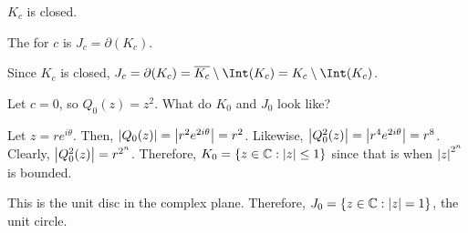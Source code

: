 \documentclass[class=pmath370,tikz,notes]{agony}
\begin{document}
\begin{lemma}[Assignment 4]
  $K_c$ is closed.
\end{lemma}

\begin{defn}
  The  for $c$ is $J_c = \partial(K_c)$.
\end{defn}

\begin{remark}
  Since $K_c$ is closed, $J_c = \partial(K_c) = \overline{K_c} \setminus \Int(K_c) = K_c \setminus \Int(K_c)$.
\end{remark}

\begin{example}
  Let $c = 0$, so $Q_0(z) = z^2$. What do $K_0$ and $J_0$ look like?
\end{example}
\begin{sol}
  Let $z = re^{i\theta}$.
  Then, $\abs{Q_0(z)} = \abs{r^2e^{2i\theta}} = r^2$.
  Likewise, $\abs{Q_0^2(z)} = \abs{r^4e^{2i\theta}} = r^8$.
  Clearly, $\abs{Q_0^2(z)} = r^{2^n}$.
  Therefore, $K_0 = \{z \in \mathbb{C} : \abs{z} \leq 1\}$
  since that is when $\abs{z}^{2^n}$ is bounded.

  This is the unit disc in the complex plane.
  Therefore, $J_0 = \{z \in \mathbb{C} : \abs{z} = 1\}$, the unit circle.
\end{sol}
\end{document}

